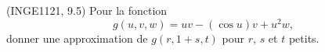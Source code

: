 
\begin{exercice}\label{exoFoncDeuxVar0023}

	(INGE1121, 9.5) Pour la fonction 
	\begin{equation}
		g(u,v,w)=uv-(\cos u)v+u^2w,
	\end{equation}
	donner une approximation de $g(r,1+s,t)$ pour $r$, $s$ et $t$ petits.

\end{exercice}

